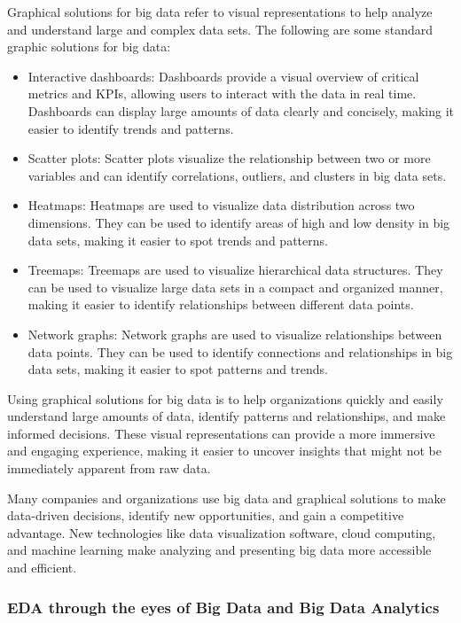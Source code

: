 \documentclass[print]{nuthesis}
\providecommand{\tightlist}{%
  \setlength{\itemsep}{0pt}\setlength{\parskip}{0pt}}
\begin{document}
Graphical solutions for big data refer to visual representations to help analyze and understand large and complex data sets. The following are some standard graphic solutions for big data:

\begin{itemize}
\tightlist
\item
  Interactive dashboards: Dashboards provide a visual overview of critical metrics and KPIs, allowing users to interact with the data in real time. Dashboards can display large amounts of data clearly and concisely, making it easier to identify trends and patterns.
\item
  Scatter plots: Scatter plots visualize the relationship between two or more variables and can identify correlations, outliers, and clusters in big data sets.
\item
  Heatmaps: Heatmaps are used to visualize data distribution across two dimensions. They can be used to identify areas of high and low density in big data sets, making it easier to spot trends and patterns.
\item
  Treemaps: Treemaps are used to visualize hierarchical data structures. They can be used to visualize large data sets in a compact and organized manner, making it easier to identify relationships between different data points.
\item
  Network graphs: Network graphs are used to visualize relationships between data points. They can be used to identify connections and relationships in big data sets, making it easier to spot patterns and trends.
\end{itemize}

Using graphical solutions for big data is to help organizations quickly and easily understand large amounts of data, identify patterns and relationships, and make informed decisions. These visual representations can provide a more immersive and engaging experience, making it easier to uncover insights that might not be immediately apparent from raw data.

Many companies and organizations use big data and graphical solutions to make data-driven decisions, identify new opportunities, and gain a competitive advantage. New technologies like data visualization software, cloud computing, and machine learning make analyzing and presenting big data more accessible and efficient.

\hypertarget{eda-through-the-eyes-of-big-data-and-big-data-analytics}{%
\subsubsection{EDA through the eyes of Big Data and Big Data Analytics}\label{eda-through-the-eyes-of-big-data-and-big-data-analytics}}
\end{document}

